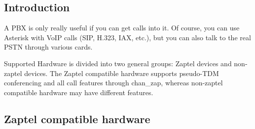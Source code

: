 \subsection{Introduction}

A PBX is only really useful if you can get calls into it.  Of course, you
can use Asterisk with VoIP calls (SIP, H.323, IAX, etc.), but you can also 
talk to the real PSTN through various cards.

Supported Hardware is divided into two general groups:  Zaptel devices and 
non-zaptel devices.  The Zaptel compatible hardware supports pseudo-TDM 
conferencing and all call features through chan\_zap, whereas non-zaptel 
compatible hardware may have different features.

\subsection{Zaptel compatible hardware}

